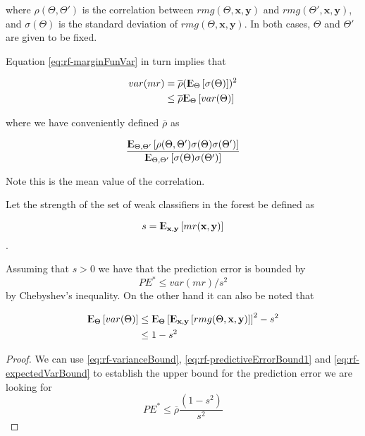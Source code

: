 \documentclass{article}%
\newcommand{\Expect}{{\rm I\kern-.3em E}}
\theoremstyle{definition}
\begin{document}
where $ \rho(\Theta, \Theta')$ is the correlation between $rmg(\Theta,\textbf{x},\textbf{y})$ and $rmg(\Theta',\textbf{x},\textbf{y})$, and $\sigma(\Theta)$ is the standard deviation of $rmg(\Theta,\textbf{x},\textbf{y})$. In both cases, $\Theta$ and $\Theta'$ are given to be fixed. 

Equation \ref{eq:rf-marginFunVar} in turn implies that 

\begin{equation}\label{eq:rf-varianceBound}
\begin{split}
var(mr) & =  \overline{\rho} (\Expect_{\Theta}\left[ \sigma(\Theta)\right] )^2 \\
		& \leq  \overline{\rho} \Expect_{\Theta} \left[ var(\Theta) \right] 
\end{split}
\end{equation}

where we have conveniently defined $\overline{\rho}$ as 

\begin{equation}\label{eq:rf-meanCorrelation}
 \frac{\Expect_{\Theta, \Theta'} \left[ \rho(\Theta, \Theta') \sigma(\Theta) \sigma(\Theta')\right]}
 {\Expect_{\Theta, \Theta'} \left[ \sigma(\Theta) \sigma(\Theta')\right]}
\end{equation}

Note this is the mean value of the correlation.

Let the strength of the set of weak classifiers in the forest be defined as 

$$s =  \Expect_{\textbf{x},\textbf{y}} \left[ mr(\textbf{x},\textbf{y} ) \right] $$.\label{eq:rf-strength}

Assuming that $s > 0$ we have that the prediction error is bounded by 
\begin{equation}\label{eq:rf-predictiveErrorBound1}
	PE^* \leq var(mr)/s^2
\end{equation}
by Chebyshev's inequality. On the other hand it can also be noted that


\begin{equation}\label{eq:rf-expectedVarBound}
\begin{split}
\Expect_{\Theta} \left[ var(\Theta) \right]  & \leq \Expect_{\Theta} \left[ \Expect_{\textbf{x},\textbf{y}}\left[ rmg(\Theta,\textbf{x},\textbf{y})   \right]  \right]^2 -s^2  \\
								& \leq 1-s^2
\end{split}
\end{equation}

\begin{proof}
We can use  \ref{eq:rf-varianceBound}, \ref{eq:rf-predictiveErrorBound1} and \ref{eq:rf-expectedVarBound} to establish the upper bound for the prediction error we are looking for
\begin{equation}\label{eq:rf-PEBound}
PE^* \leq \overline{\rho}\frac{(1-s^2)}{s^2}
\end{equation}
\end{proof}
\end{document}
